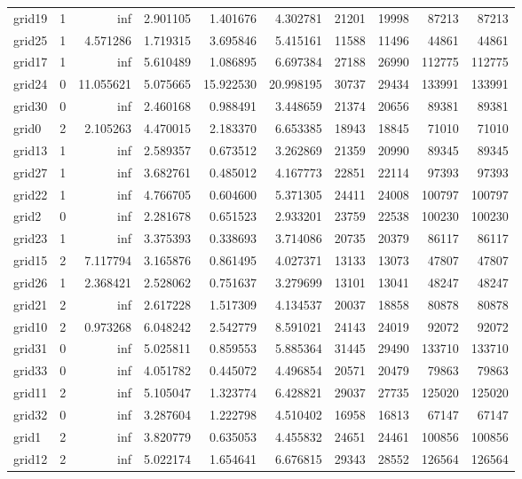 \begin{longtable}{|l|r|r|r|r|r|r|r|r|r|}
grid19 & 1 & inf & 2.901105 & 1.401676 & 4.302781 & 21201 & 19998 & 87213 & 87213 \\
grid25 & 1 & 4.571286 & 1.719315 & 3.695846 & 5.415161 & 11588 & 11496 & 44861 & 44861 \\
grid17 & 1 & inf & 5.610489 & 1.086895 & 6.697384 & 27188 & 26990 & 112775 & 112775 \\
grid24 & 0 & 11.055621 & 5.075665 & 15.922530 & 20.998195 & 30737 & 29434 & 133991 & 133991 \\
grid30 & 0 & inf & 2.460168 & 0.988491 & 3.448659 & 21374 & 20656 & 89381 & 89381 \\
grid0 & 2 & 2.105263 & 4.470015 & 2.183370 & 6.653385 & 18943 & 18845 & 71010 & 71010 \\
grid13 & 1 & inf & 2.589357 & 0.673512 & 3.262869 & 21359 & 20990 & 89345 & 89345 \\
grid27 & 1 & inf & 3.682761 & 0.485012 & 4.167773 & 22851 & 22114 & 97393 & 97393 \\
grid22 & 1 & inf & 4.766705 & 0.604600 & 5.371305 & 24411 & 24008 & 100797 & 100797 \\
grid2 & 0 & inf & 2.281678 & 0.651523 & 2.933201 & 23759 & 22538 & 100230 & 100230 \\
grid23 & 1 & inf & 3.375393 & 0.338693 & 3.714086 & 20735 & 20379 & 86117 & 86117 \\
grid15 & 2 & 7.117794 & 3.165876 & 0.861495 & 4.027371 & 13133 & 13073 & 47807 & 47807 \\
grid26 & 1 & 2.368421 & 2.528062 & 0.751637 & 3.279699 & 13101 & 13041 & 48247 & 48247 \\
grid21 & 2 & inf & 2.617228 & 1.517309 & 4.134537 & 20037 & 18858 & 80878 & 80878 \\
grid10 & 2 & 0.973268 & 6.048242 & 2.542779 & 8.591021 & 24143 & 24019 & 92072 & 92072 \\
grid31 & 0 & inf & 5.025811 & 0.859553 & 5.885364 & 31445 & 29490 & 133710 & 133710 \\
grid33 & 0 & inf & 4.051782 & 0.445072 & 4.496854 & 20571 & 20479 & 79863 & 79863 \\
grid11 & 2 & inf & 5.105047 & 1.323774 & 6.428821 & 29037 & 27735 & 125020 & 125020 \\
grid32 & 0 & inf & 3.287604 & 1.222798 & 4.510402 & 16958 & 16813 & 67147 & 67147 \\
grid1 & 2 & inf & 3.820779 & 0.635053 & 4.455832 & 24651 & 24461 & 100856 & 100856 \\
grid12 & 2 & inf & 5.022174 & 1.654641 & 6.676815 & 29343 & 28552 & 126564 & 126564 \\

\end{longtable}
